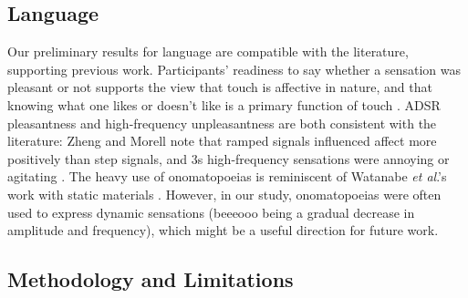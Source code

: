 %
%
\subsection{Language}

Our preliminary results for language are compatible with the literature,
supporting previous work.
Participants' readiness to say whether a sensation was pleasant or not supports the 
view that touch is affective in nature, and that knowing what one likes or doesn't like is a primary function of touch \cite{Jansson-Boyd2011}.
ADSR pleasantness and high-frequency unpleasantness are both consistent with the literature: Zheng and Morell note that ramped signals influenced affect more positively than step signals, and 3s high-frequency sensations were annoying or agitating \cite{Zheng2012}.
The heavy use of onomatopoeias is reminiscent of Watanabe \emph{et al}.'s work with static materials \cite{Watanabe2012}.
However, in our study, onomatopoeias were often used to express dynamic sensations (beeeooo being a gradual decrease in amplitude and frequency), which might be a useful direction for future work.



%
%
\subsection{Methodology and Limitations}

